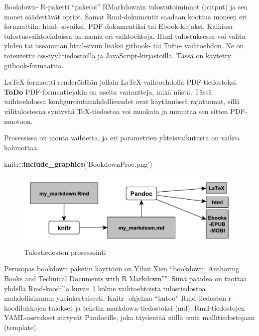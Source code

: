 \documentclass[finnish,]{book}
\newenvironment{Shaded}{\begin{snugshade}}{\end{snugshade}}
\newcommand{\KeywordTok}[1]{\textcolor[rgb]{0.13,0.29,0.53}{\textbf{#1}}}
\newcommand{\NormalTok}[1]{#1}
\newcommand{\OperatorTok}[1]{\textcolor[rgb]{0.81,0.36,0.00}{\textbf{#1}}}
\newcommand{\StringTok}[1]{\textcolor[rgb]{0.31,0.60,0.02}{#1}}
\theoremstyle{definition}
\theoremstyle{definition}
\theoremstyle{definition}
\theoremstyle{remark}
\begin{document}
Bookdown- R-paketti ``paketoi'' RMarkdownin tulostutoiminnot (output) ja
sen monet säädettävät optiot. Samat Rmd-dokumentit saadaan koottua
moneen eri formaattiin: html- sivuiksi, PDF-dokumentiksi tai
Ebook-kirjaksi. Kaikissa tulostusvaihtoehdoissa on monia eri
vaihtoehtoja. Html-tulostuksessa voi valita yhden tai useamman
html-sivun lisäksi gitbook- tai Tufte- vaihtoehdon. Ne on toteutettu
css-tyylitiedostoilla ja JavaScript-kirjastoilla. Tässä on käytetty
gitbook-formaattia.

LaTeX-formaatti renderöidään jollain LaTeX-vaihtoehdolla
PDF-tiedostoksi. \textbf{ToDo} PDF-formaattejakin on useita variantteja,
mikä niistä. Tässä vaihtoehdossa konfigurointimahdollisuudet ovat
käytännössä rajattomat, sillä välitulosteena syntyvää TeX-tiedostoa voi
muokata ja muuntaa sen sitten PDF-muotoon.

Prosessissa on monta vaihtetta, ja eri parametrien yhteisvaikutusta on
vaikea hahmottaa.

\begin{Shaded}
\begin{Highlighting}[]
\NormalTok{knitr}\OperatorTok{::}\KeywordTok{include_graphics}\NormalTok{(}\StringTok{'BookdownProc.png'}\NormalTok{)}
\end{Highlighting}
\end{Shaded}

\begin{figure}

{\centering \includegraphics[width=0.5\linewidth]{BookdownProc} 

}

\caption{Tulostiedoston prosessointi}\label{fig:bdprocess}
\end{figure}

Perusopas bookdown paketin käyttöön on Yihui Xien
\href{https://bookdown.org/yihui/bookdown/}{``bookdown: Authoring Books
and Technical Documents with R Markdown''"}. Siinä pääidea on tuottaa
yhdellä Rmd-koodilla kuvan \ref{fig:bdprocess} kolme vaihtoehtoista
tulostiedostoa mahdollisimman yksinkertaisesti. Knitr- ohjelma ``kutoo''
Rmd-tiedoston r-koodilohkojen tulokset ja tekstin markdown-tiedostoksi
(md). Rmd-tiedostojen YAML-asetukset siirtyvät Pandocille, joka
täydentää niillä omia mallitiedostojaan (template).
\end{document}
